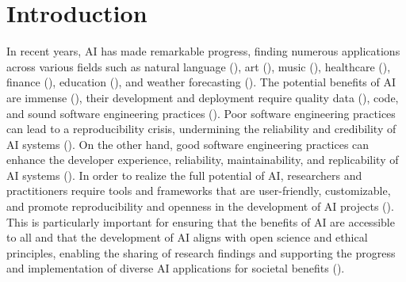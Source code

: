 
\section{Introduction}


 In recent years, AI has made remarkable progress, finding numerous applications across various fields such as natural language (\cite{gpt,gato}), art (\cite{diffusion}), music (\cite{musiclm}), healthcare (\cite{aihealthcare}), finance (\cite{bao2022fraudartificial}), education (\cite{aieducation}), and weather forecasting (\cite{weather}). The potential benefits of AI are immense (\cite{beneficialai,potencialaibenefit}), their development and deployment require quality data (\cite{lecun2015deep}), code, and sound software engineering practices (\cite{se4dl,amershi2019software}). Poor software engineering practices can lead to a reproducibility crisis, undermining the reliability and credibility of AI systems (\cite{leakage-recrisis}). On the other hand, good software engineering practices can enhance the developer experience, reliability, maintainability, and replicability of AI systems (\cite{se4dl,amershi2019software, wan2019does}). In order to realize the full potential of AI, researchers and practitioners require tools and frameworks that are user-friendly, customizable, and promote reproducibility and openness in the development of AI projects (\cite{li2018can,wolf2020designing,olson2018system,ong2021guide,gundersen2018reproducible}). This is particularly important for ensuring that the benefits of AI are accessible to all and that the development of AI aligns with open science and ethical principles, enabling the sharing of research findings and supporting the progress and implementation of diverse AI applications for societal benefits (\cite{coro2020open,braun2018open, mittelstadt2016ethics,floridi2018ai4people,ong2021guide}).


